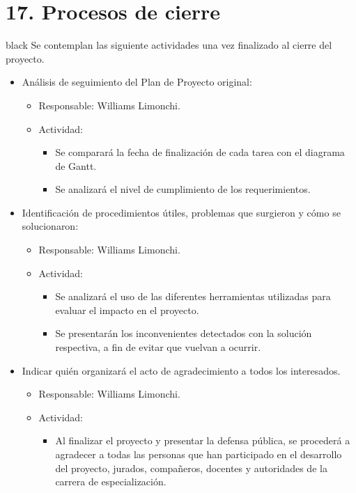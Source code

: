 \documentclass[11pt]{charter}
\begin{document}
\section{17. Procesos de cierre}    
\label{sec:cierre}
\vspace{-10px}
\begin{consigna}{black}
Se contemplan las siguiente actividades una vez finalizado al cierre del proyecto.
\vspace{-10px}
\begin{itemize}
\item Análisis de seguimiento del Plan de Proyecto original:
\begin{itemize}
\item Responsable: Williams Limonchi.
\item Actividad:
\begin{itemize} 
\item Se comparará la fecha de finalización de cada tarea con el diagrama de Gantt.
\item Se analizará el nivel de cumplimiento de los requerimientos. 
\end{itemize}
\end{itemize}
\item Identificación de procedimientos útiles, problemas que surgieron y cómo se solucionaron:
\begin{itemize}
\item Responsable: Williams Limonchi.
\item Actividad:
\begin{itemize} 
\item Se analizará el uso de las diferentes herramientas utilizadas para evaluar el impacto en el proyecto. 
\item Se presentarán los inconvenientes detectados con la solución respectiva, a fin de evitar que vuelvan a ocurrir. 
\end{itemize}
\end{itemize}
\item Indicar quién organizará el acto de agradecimiento a todos los interesados.
\begin{itemize}
\item Responsable: Williams Limonchi.
\item Actividad:
\begin{itemize} 
\item Al finalizar el proyecto y presentar la defensa pública, se procederá a agradecer a todas las personas que han participado en el desarrollo del proyecto, jurados, compañeros, docentes y autoridades de la carrera de especialización. 
\end{itemize}
\end{itemize}
\end{itemize}

\end{consigna}
\end{document}
